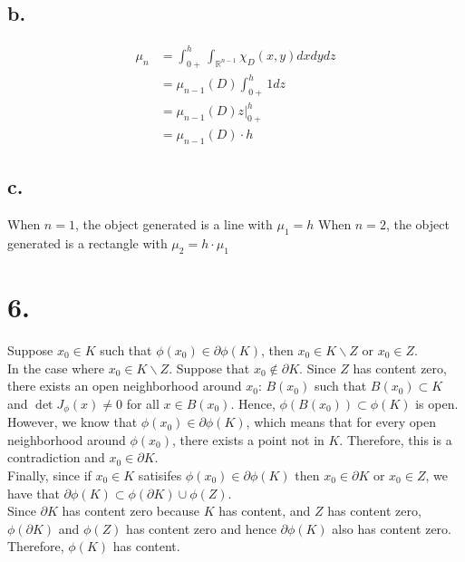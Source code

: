 \documentclass[11pt]{article}
\begin{document}
\subsection*{b.}
\begin{equation*}
    \begin{aligned}
        \mu_n 
        &= \int_{0+}^h \int_{\mathbb{R}^{n-1}} \chi_D  \left(x, y \right) dxdydz \\
        &= \mu_{n-1}(D) \int_{0+}^h 1 dz \\
        &= \mu_{n-1}(D) \left.z \right|_{0+}^{h} \\
        &= \mu_{n-1}(D) \cdot h
    \end{aligned}
\end{equation*}
\subsection*{c.}
When $n=1$, the object generated is a line with $\mu_1 = h$
When $n=2$, the object generated is a rectangle with $\mu_2 = h \cdot \mu_1$
\pagebreak
\section*{6.}
Suppose $x_0 \in K$ such that $\phi(x_0) \in \partial \phi(K)$, then $x_0 \in K\backslash Z$ or $x_0 \in Z$. \\
In the case where $x_0 \in K\backslash Z$. Suppose that $x_0 \notin \partial K$. 
Since $Z$ has content zero, 
there exists an open neighborhood around $x_0$: $B(x_0)$ such that $B(x_0) \subset K$ and $\det J_\phi(x) \ne 0$ for all $x \in B(x_0)$.
Hence, $\phi(B(x_0)) \subset \phi(K)$ is open. \\
However, we know that $\phi(x_0) \in \partial \phi(K)$, 
which means that for every open neighborhood around $\phi(x_0)$, there exists a point not in $K$. 
Therefore, this is a contradiction and $x_0 \in \partial K$. \\
Finally, since if $x_0 \in K$ satisifes $\phi(x_0) \in \partial \phi(K)$ then $x_0 \in \partial K$ or $x_0 \in Z$, 
we have that $\partial\phi(K) \subset \phi(\partial K) \cup \phi(Z)$. \\
Since $\partial K$ has content zero because $K$ has content, and $Z$ has content zero, 
$\phi(\partial K)$ and $\phi(Z)$ has content zero and hence $\partial \phi(K)$ also has content zero. Therefore, $\phi(K)$ has content.
\end{document}
